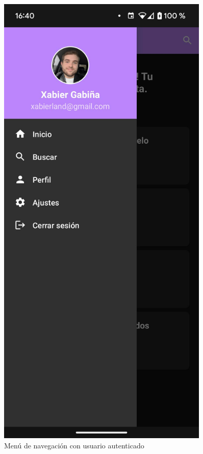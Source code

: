 \documentclass[a4paper,12pt]{report}
\begin{document}
\begin{minipage}{0.27\textwidth}
\begin{figure}[H]
          \includegraphics[width=0.9\textwidth]{.img/menu-auth.png}
          \caption{Menú de navegación con usuario autenticado}
          \label{fig:menu-navegacion-usuario}
        \end{figure}
      \end{minipage}
\end{document}

